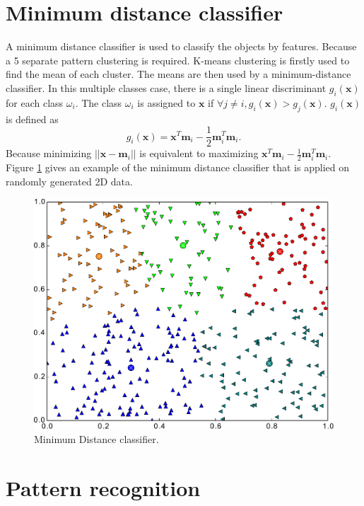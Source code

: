 \documentclass[paper=a4, fontsize=11pt]{scrartcl}
\begin{document}
\section{Minimum distance classifier}
\label{sec:classifier}

A minimum distance classifier is used to classify the objects by features.
Because a 5 separate pattern clustering is required.
K-means clustering is firstly used to find the mean of each cluster.
The means are then used by a minimum-distance classifier.
In this multiple classes case, there is a single linear discriminant $ g_{i} ( \mathbf{x} ) $ for each class $ \omega_{i} $.
The class $ \omega_{i} $ is assigned to $ \mathbf{x} $ if $ \forall j \neq i, g_{i} ( \mathbf{x} ) > g_{j} ( \mathbf{x} ) $.
$ g_{i}( \mathbf{x} ) $ is defined as 
\begin{equation}
g_{i}( \mathbf{x} ) = \mathbf{x}^{T} \mathbf{m}_{i} - \frac{1}{2} \mathbf{m}_{i}^{T} \mathbf{m}_{i}.
\end{equation}
Because minimizing $ || \mathbf{x} - \mathbf{m}_{i} || $ is equivalent to maximizing $ \mathbf{x}^{T} \mathbf{m}_{i} - \frac{1}{2} \mathbf{m}_{i}^{T} \mathbf{m}_{i} $.
Figure \ref{fig:min_dist_classifer} gives an example of the minimum distance classifier that is applied on randomly generated 2D data.

\begin{figure}
\centering
\includegraphics[width=0.7\linewidth]{./figure/kmean}
\caption{Minimum Distance classifier.}
\label{fig:min_dist_classifer}
\end{figure}

\section{Pattern recognition}
\label{sec:pattern_recognition}
\end{document}
